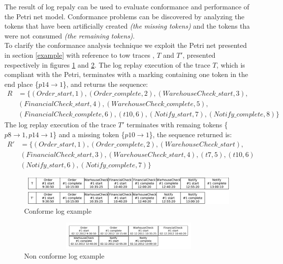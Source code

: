 \documentclass[11pt]{article}
\begin{document}
The result of log repaly can be used to evaluate conformance and performance of the Petri net model. Conformance problems can be discovered by analyzing the tokens that have been artificially created {\itshape (the missing tokens)} and the tokens tha were not consumed {\itshape (the remaining tokens)}.\\

To clarify the conformance analysis technique we exploit the Petri net presented in section \ref{example} with reference to tow traces , $T$ and $T'$, presented respectively in figures \ref{ConfLog} and \ref{NonConfLog}. The log replay execution of the trace $T$, which is compliant with the Petri, terminates with a marking containing one token in the end place \{${p14 \rightarrow 1}$\}, and returns the sequence:
\begin{equation}
\begin{split}
R&=\{(Order\_start,1), (Order\_complete,2),(WarehouseCheck\_start,3), \\
& (FinancialCheck\_start,4),(WarehouseCheck\_complete,5),\\
& (FinancialCheck\_complete,6),(t10, 6), (Notify\_start,7), (Notify\_complete,8)\}
\end{split}
\end{equation}
The log replay execution of the trace $T'$ terminates with remaing tokens \{${p8 \rightarrow 1,p14 \rightarrow 1}$\} and a missing token \{${p10 \rightarrow 1}$\}, the sequence returned is:
\begin{equation}
\begin{split}
R'&=\{(Order\_start,1), (Order\_complete,2), (WarehouseCheck\_start), \\
& (FinancialCheck\_start,3), (WarehouseCheck\_start,4),(t7,5), (t10,6)\\
& (Notify\_start,6), (Notify\_complete,7)\}
\end{split}
\end{equation}

\begin{figure}[H]\label{ConfLog}
\centering
\includegraphics[width=400pt,height=40pt]
{./items/logConforme.pdf}
\caption{Conforme log example}
\end{figure}

\begin{figure}[H]\label{NonConfLog}
\centering
\includegraphics[width=400pt,height=40pt]
{./items/logNonConforme.pdf}
\caption{Non conforme log example}
\end{figure}
\end{document}
